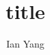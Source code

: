 \documentclass[a4paper,fontsize=11pt,DIV=15,%
parskip=half,headsepline,%
abstract,index=totoc,bibliography=totoc,listof=toc%
]{scrreprt}
\theoremstyle{definition} \newtheorem{definition}{Definition}
\begin{document}
\author{Ian Yang}
\title{title}
\maketitle

\tableofcontents
\listoftables
\listoffigures

% 

\clearpage
% 
\printindex
\end{document}
